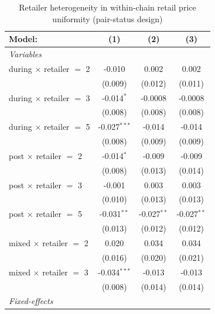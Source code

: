 
\begin{table}[htbp]
   \caption{\label{tab:uniformity_heterog_retail} Retailer heterogeneity in within-chain retail price uniformity (pair-status design)}
   \centering
   \begin{tabular}{lccc}
      \tabularnewline \midrule \midrule
      Model:                          & (1)            & (2)           & (3)\\  
      \midrule
      \emph{Variables}\\
      during $\times$ retailer $=$ 2  & -0.010         & 0.002         & 0.002\\   
                                      & (0.009)        & (0.012)       & (0.011)\\   
      during $\times$ retailer $=$ 3  & -0.014$^{*}$   & -0.0008       & -0.0008\\   
                                      & (0.008)        & (0.008)       & (0.008)\\   
      during $\times$ retailer $=$ 5  & -0.027$^{***}$ & -0.014        & -0.014\\   
                                      & (0.008)        & (0.009)       & (0.009)\\   
      post $\times$ retailer $=$ 2    & -0.014$^{*}$   & -0.009        & -0.009\\   
                                      & (0.008)        & (0.013)       & (0.014)\\   
      post $\times$ retailer $=$ 3    & -0.001         & 0.003         & 0.003\\   
                                      & (0.010)        & (0.013)       & (0.013)\\   
      post $\times$ retailer $=$ 5    & -0.031$^{**}$  & -0.027$^{**}$ & -0.027$^{**}$\\   
                                      & (0.013)        & (0.012)       & (0.012)\\   
      mixed $\times$ retailer $=$ 2   & 0.020          & 0.034         & 0.034\\   
                                      & (0.016)        & (0.020)       & (0.021)\\   
      mixed $\times$ retailer $=$ 3   & -0.034$^{***}$ & -0.013        & -0.013\\   
                                      & (0.008)        & (0.014)       & (0.014)\\   
      \midrule
      \emph{Fixed-effects}\\

\end{tabular}
\end{table}
